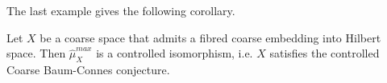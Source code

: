 The last example gives the following corollary.

\begin{cor}
Let $X$ be a coarse space that admits a fibred coarse embedding into Hilbert space. Then $\hat \mu_{X}^{max}$ is a controlled isomorphism, i.e. $X$ satisfies the controlled Coarse Baum-Connes conjecture.
\end{cor}



